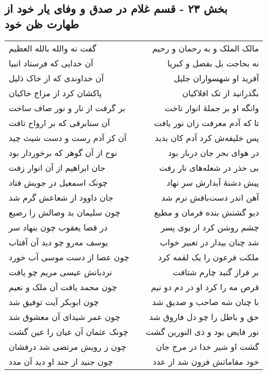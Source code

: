 \begin{center}
\section*{بخش ۲۳ - قسم غلام در صدق و وفای یار خود از طهارت ظن خود}
\label{sec:sh023}
\begin{longtable}{l p{0.5cm} r}
گفت نه والله بالله العظیم
&&
مالک الملک و به رحمان و رحیم
\\
آن خدایی که فرستاد انبیا
&&
نه بحاجت بل بفضل و کبریا
\\
آن خداوندی که از خاک ذلیل
&&
آفرید او شهسواران جلیل
\\
پاکشان کرد از مزاج خاکیان
&&
بگذرانید از تک افلاکیان
\\
بر گرفت از نار و نور صاف ساخت
&&
وانگه او بر جملهٔ انوار تاخت
\\
آن سنابرقی که بر ارواح تافت
&&
تا که آدم معرفت زان نور یافت
\\
آن کز آدم رست و دست شیث چید
&&
پس خلیفه‌ش کرد آدم کان بدید
\\
نوح از آن گوهر که برخوردار بود
&&
در هوای بحر جان دربار بود
\\
جان ابراهیم از آن انوار زفت
&&
بی حذر در شعله‌های نار رفت
\\
چونک اسمعیل در جویش فتاد
&&
پیش دشنهٔ آبدارش سر نهاد
\\
جان داوود از شعاعش گرم شد
&&
آهن اندر دست‌بافش نرم شد
\\
چون سلیمان بد وصالش را رضیع
&&
دیو گشتش بنده فرمان و مطیع
\\
در قضا یعقوب چون بنهاد سر
&&
چشم روشن کرد از بوی پسر
\\
یوسف مه‌رو چو دید آن آفتاب
&&
شد چنان بیدار در تعبیر خواب
\\
چون عصا از دست موسی آب خورد
&&
ملکت فرعون را یک لقمه کرد
\\
نردبانش عیسی مریم چو یافت
&&
بر فراز گنبد چارم شتافت
\\
چون محمد یافت آن ملک و نعیم
&&
قرص مه را کرد او در دم دو نیم
\\
چون ابوبکر آیت توفیق شد
&&
با چنان شه صاحب و صدیق شد
\\
چون عمر شیدای آن معشوق شد
&&
حق و باطل را چو دل فاروق شد
\\
چونک عثمان آن عیان را عین گشت
&&
نور فایض بود و ذی النورین گشت
\\
چون ز رویش مرتضی شد درفشان
&&
گشت او شیر خدا در مرج جان
\\
چون جنید از جند او دید آن مدد
&&
خود مقاماتش فزون شد از عدد
\\

\end{longtable}
\end{center}

